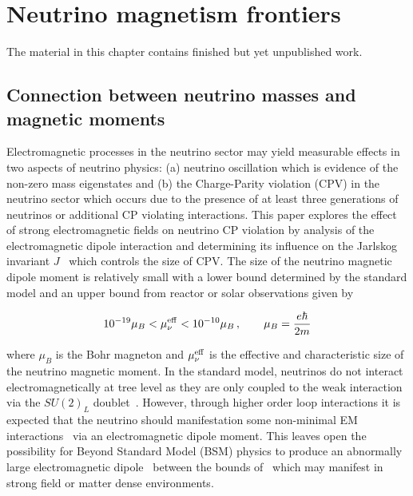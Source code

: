 \chapter{Neutrino magnetism frontiers}
\label{chap:neutrino}
\noindent The material in this chapter contains finished but yet unpublished work.



\section{Connection between neutrino masses and magnetic moments}\label{sec:flavor}
\noindent Electromagnetic processes in the neutrino sector may yield measurable effects in two aspects of neutrino physics: (a) neutrino oscillation which is evidence of the non-zero mass eigenstates and (b) the Charge-Parity violation (CPV) in the neutrino sector which occurs due to the presence of at least three generations of neutrinos or additional CP violating interactions. This paper explores the effect of strong electromagnetic fields on neutrino CP violation by analysis of the electromagnetic dipole interaction and determining its influence on the Jarlskog invariant $J$~\citep{jarlskog1985basis,jarlskog1985commutator,jarlskog2005invariants} which controls the size of CPV. The size of the neutrino magnetic dipole moment is relatively small with a lower bound determined by the standard model and an upper bound from reactor or solar observations given by~\citep{alexander2016status,canas2016updating,sierra2022neutrino}

\begin{align}
    \label{momentbound:1}
    10^{-19}\mu_{B}<\mu_{\nu}^{\rm eff}<10^{-10}\mu_{B}\,,\qquad\mu_{B}=\frac{e\hbar}{2m}
\end{align}

where $\mu_{B}$ is the Bohr magneton and $\mu_{\nu}^{\rm eff}$ is the effective and characteristic size of the neutrino magnetic moment. In the standard model, neutrinos do not interact electromagnetically at tree level as they are only coupled to the weak interaction via the $SU(2)_{L}$ doublet~\citep{Schwartz:2014sze}. However, through higher order loop interactions it is expected that the neutrino should manifestation some non-minimal EM interactions~\citep{shrock1980new,abi2021prospects} via an electromagnetic dipole moment. This leaves open the possibility for Beyond Standard Model (BSM) physics to produce an abnormally large electromagnetic dipole~\citep{giunti2015neutrino,lindner2017revisiting,brdar2021neutrino} between the bounds of~ which may manifest in strong field or matter dense environments.

